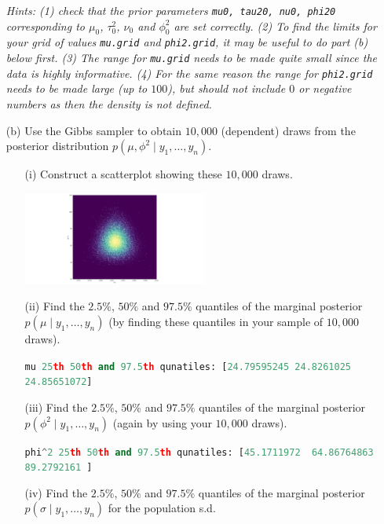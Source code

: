 \documentclass{article}
\newcommand{\1}{\mathbf{1}}
\begin{document}
\begin{enumerate}
\begin{enumerate}
    \end{enumerate}
    {\it Hints: (1) check that the prior parameters {\tt mu0, tau20, nu0, phi20} corresponding to $\mu_0$, $\tau^2_0$, $\nu_0$ and $\phi^2_0$ are set correctly. (2) To find the limits for your grid of values {\tt mu.grid} and {\tt phi2.grid}, it may be useful to do part (b) below first. (3) The range for {\tt mu.grid} needs to be made quite small since the data is highly informative. (4) For the same reason the range for {\tt phi2.grid} needs to be made large (up to $100$), but should not include $0$ or negative numbers as then the density is not defined.}

    \newpage
    \item[(b)] Use the Gibbs sampler to obtain $10,000$ (dependent) draws from the posterior distribution $p(\mu,\phi^2 \mid y_1,\ldots ,y_n)$. 
    \begin{enumerate}
        \item[(i)] Construct a scatterplot showing these $10,000$ draws.
    
        \begin{center} 
            \includegraphics[width=0.5\textwidth]{STATS509/HW6/HW6Figures/problem5bi.png}
        \end{center}
    
        \item[(ii)] Find the $2.5\%$, $50\%$ and $97.5\%$ quantiles of the marginal posterior $p(\mu \mid y_1,\ldots ,y_n)$ (by finding these quantiles in your sample of $10,000$ draws).
        
        \lstinline[language=Python]{mu 25th 50th and 97.5th qunatiles: [24.79595245 24.8261025  24.85651072]}

        \item[(iii)] Find the $2.5\%$, $50\%$ and $97.5\%$ quantiles of the marginal posterior $p(\phi^2 \mid y_1,\ldots ,y_n)$ (again by using your $10,000$ draws).
        
        \lstinline[language=Python]{phi^2 25th 50th and 97.5th qunatiles: [45.1711972  64.86764863 89.2792161 ]}
    
        \item[(iv)] Find the $2.5\%$, $50\%$ and $97.5\%$ quantiles of the marginal posterior $p(\sigma \mid y_1,\ldots ,y_n)$ for the population s.d. 
        

\end{enumerate}
\end{enumerate}
\end{document}
